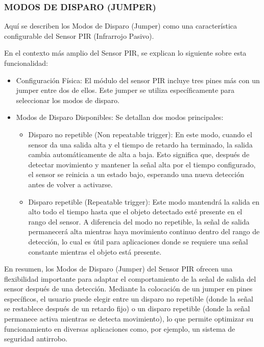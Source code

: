 \documentclass{report}
\begin{document}
\subsubsection{MODOS DE DISPARO (JUMPER)}
Aquí se describen los Modos de Disparo (Jumper) como una característica configurable del Sensor 
PIR (Infrarrojo Pasivo).

En el contexto más amplio del Sensor PIR, se  explican lo siguiente sobre esta funcionalidad:
\begin{itemize}
    \item Configuración Física: El módulo del sensor PIR incluye tres pines más con un jumper entre dos de ellos. Este jumper se utiliza específicamente 
    para seleccionar los modos de disparo.
    \item Modos de Disparo Disponibles: Se detallan dos modos principales:
    \begin{itemize}
        \item Disparo no repetible (Non repeatable trigger): En este modo, cuando el sensor da una salida alta y el tiempo de retardo ha terminado, la 
        salida cambia automáticamente de alta a baja. Esto significa que, después de detectar movimiento y mantener la señal alta por el tiempo configurado, 
        el sensor se reinicia a un estado bajo, esperando una nueva detección antes de volver a activarse.
        \item Disparo repetible (Repeatable trigger): Este modo mantendrá la salida en alto todo el tiempo hasta que el objeto detectado esté presente 
        en el rango del sensor. A diferencia del modo no repetible, la señal de salida permanecerá alta mientras haya movimiento continuo dentro del 
        rango de detección, lo cual es útil para aplicaciones donde se requiere una señal constante mientras el objeto está presente.
    \end{itemize}
\end{itemize}

En resumen, los Modos de Disparo (Jumper) del Sensor PIR ofrecen una flexibilidad importante para adaptar el comportamiento de la señal de salida 
del sensor después de una detección. Mediante la colocación de un jumper en pines específicos, el usuario puede elegir entre un disparo no repetible 
(donde la señal se restablece después de un retardo fijo) o un disparo repetible (donde la señal permanece activa mientras se detecta movimiento), 
lo que permite optimizar su funcionamiento en diversas aplicaciones como, por ejemplo, un sistema de seguridad antirrobo.
\end{document}
